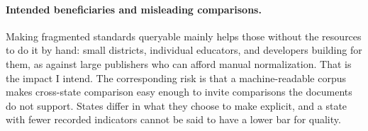 \paragraph{Intended beneficiaries and misleading comparisons.} Making fragmented standards queryable
mainly helps those without the resources to do it by hand: small districts,
individual educators, and developers building for them, as against large
publishers who can afford manual normalization. That is the impact I intend.
The corresponding risk is that a machine-readable corpus makes cross-state
comparison easy enough to invite comparisons the documents do not support.
States differ in what they choose to make explicit, and a state with fewer
recorded indicators cannot be said to have a lower bar for quality.

